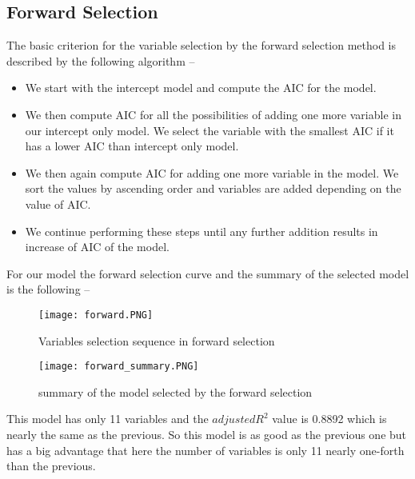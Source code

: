 \documentclass[A4paper,11pt]{report}
\begin{document}
	 \subsection{Forward Selection}
	 The basic criterion for the variable selection by the forward selection method is described by the following algorithm -- 
	 \begin{itemize}
	 	\vspace{-0.2 cm} \item We start with the intercept model and compute the AIC for the model.
	 	\vspace{-0.2 cm} \item We then compute AIC for all the possibilities of adding one more variable in our intercept only model. We select the variable with the smallest AIC if it has a lower AIC than intercept only model.
	 	\vspace{-0.2 cm} \item We then again compute AIC for adding one more variable in the model. We sort the values by ascending order and variables are added depending on the value of AIC.
	 	\vspace{-0.2 cm} \item We continue performing these steps until any further addition results in increase of AIC of the model.
	 \end{itemize}
	 \par For our model the forward selection curve and the summary of the selected model is the following --
	 \begin{figure}[H]
	 	\texttt{[image: forward.PNG]}
	 	\caption {Variables selection sequence in forward selection }
	 \end{figure}
	 \begin{figure}[H]
	 	\texttt{[image: forward\_summary.PNG]}
	 	\caption {summary of the model selected by the forward selection}
	 \end{figure}
	 \par This model has only 11 variables and the $adjusted R^2$ value is 0.8892 which is nearly the same as the previous. So this model is as good as the previous one but has a big advantage that here the number of variables is only 11 nearly one-forth than the previous.
	 
\end{document}
